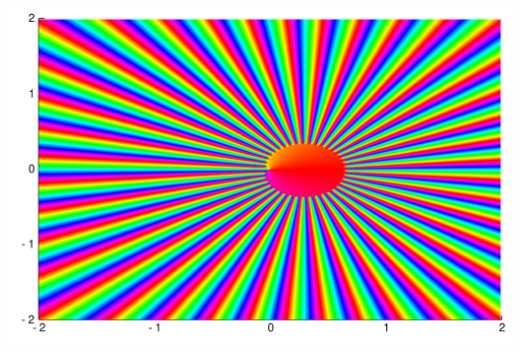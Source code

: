 \documentclass[12pt,a4paper]{article}
\begin{document}
\includegraphics[width=\linewidth]{figures/Lecture2_7_1.pdf}
\end{document}
